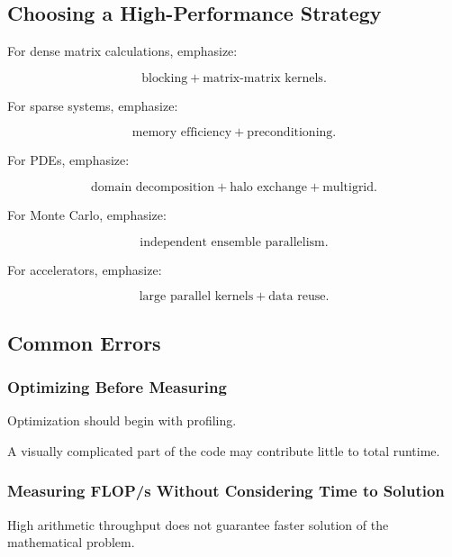 \subsection{Choosing a High-Performance Strategy}
\label{subsec:choosing-hpmc-strategy}

For dense matrix calculations, emphasize:

\[
\boxed{
\text{blocking}
+
\text{matrix-matrix kernels}.
}
\]

For sparse systems, emphasize:

\[
\boxed{
\text{memory efficiency}
+
\text{preconditioning}.
}
\]

For PDEs, emphasize:

\[
\boxed{
\text{domain decomposition}
+
\text{halo exchange}
+
\text{multigrid}.
}
\]

For Monte Carlo, emphasize:

\[
\boxed{
\text{independent ensemble parallelism}.
}
\]

For accelerators, emphasize:

\[
\boxed{
\text{large parallel kernels}
+
\text{data reuse}.
}
\]

\subsection{Common Errors}
\label{subsec:hpmc-common-errors}

\subsubsection{Optimizing Before Measuring}

Optimization should begin with profiling.

A visually complicated part of the code may contribute little to total
runtime.

\subsubsection{Measuring FLOP/s Without Considering Time to Solution}

High arithmetic throughput does not guarantee faster solution of the
mathematical problem.

